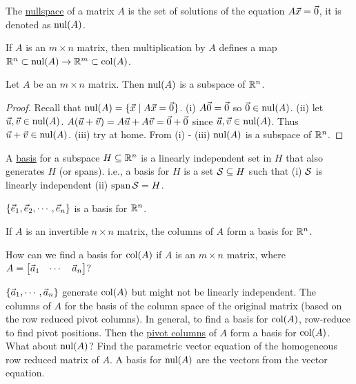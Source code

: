 \documentclass[10pt,a4paper]{article}
\begin{document}
\begin{definition}
	The \underline{nullspace} of a matrix $A$ is the set of solutions of the equation $A\vec{x}=\vec{0}$, it is denoted as $\text{nul}(A)$.
\end{definition}
\begin{note}
	If $A$ is an $m\times n$ matrix, then multiplication by $A$ defines a map $\mathbb{R}^n \subset \text{nul}(A) \rightarrow \mathbb{R}^m\subset \text{col}(A)$.
\end{note}

\begin{theorem}
	Let $A$ be an $m\times n$ matrix. Then $\text{nul}(A)$ is a subspace of $\mathbb{R}^n$.
\end{theorem}
\begin{proof}
	Recall that $\text{nul}(A) = \{\vec{x}\mid A\vec{x}=\vec{0}\}$. (i) $A\vec{0} = \vec{0}$ so $\vec{0}\in \text{nul}(A)$. (ii) let $\vec{u},\vec{v}\in\text{nul}(A)$. $A(\vec{u}+\vec{v}) = A\vec{u}+A\vec{v} = \vec{0} + \vec{0}$ since $\vec{u},\vec{v}\in \text{nul}(A)$. Thus $\vec{u}+\vec{v}\in\text{nul}(A)$. (iii) try at home. From (i) - (iii) $\text{nul}(A)$ is a subspace of $\mathbb{R}^n$.
\end{proof}

\begin{definition}
	A \underline{basis} for a subspace $H \subseteq \mathbb{R}^n$ is a linearly independent set in $H$ that also generates $H$ (or spans). i.e., a basis for $H$ is a set $\mathcal{S}\subseteq H$ such that (i) $\mathcal{S}$ is linearly independent (ii) $\text{span}\,\mathcal{S} = H$.
\end{definition}

\begin{example}
	$\{\vec{e}_1,\vec{e}_2,\cdots,\vec{e}_n\}$ is a basis for $\mathbb{R}^n$.
\end{example}
\begin{example}
	If $A$ is an invertible $n\times n$ matrix, the columns of $A$ form a basis for $\mathbb{R}^n$.
\end{example}

How can we find a basis for $\text{col}(A)$ if $A$ is an $m\times n$ matrix, where $A= \begin{bmatrix} \vec{a}_1 & \cdots & \vec{a}_n \end{bmatrix}$?
\begin{note}
	$\{\vec{a}_1,\cdots,\vec{a}_n\}$ generate $\text{col}(A)$ but might not be linearly independent. The columns of $A$ for the basis of the column space of the original matrix (based on the row reduced pivot columns). In general, to find a basis for $\text{col}(A)$, row-reduce to find pivot positions. Then the \underline{pivot columns} of $A$ form a basis for $\text{col}(A)$. What about $\text{nul}(A)$? Find the parametric vector equation of the homogeneous row reduced matrix of $A$. A basis for $\text{nul}(A)$ are the vectors from the vector equation.
\end{note}
\end{document}
